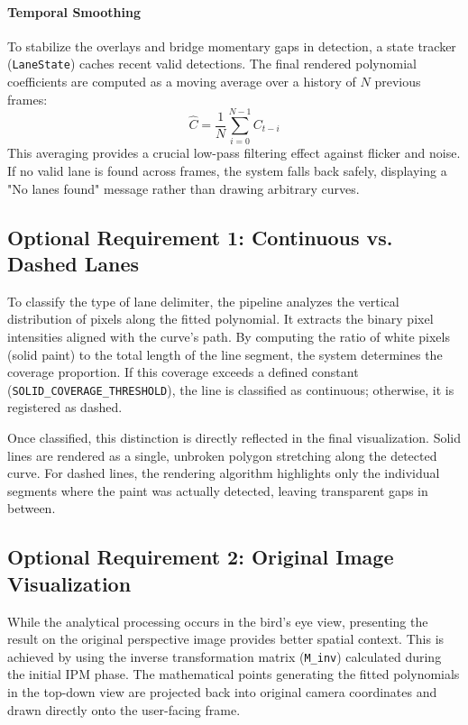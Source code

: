 \documentclass[12pt,a4paper]{article}
\begin{document}
\paragraph{Temporal Smoothing}
To stabilize the overlays and bridge momentary gaps in detection, a state tracker (\texttt{LaneState}) caches recent valid detections. The final rendered polynomial coefficients are computed as a moving average over a history of $N$ previous frames:
\begin{equation}
    \hat{C} = \frac{1}{N} \sum_{i=0}^{N-1} C_{t-i}
\end{equation}
This averaging provides a crucial low-pass filtering effect against flicker and noise. If no valid lane is found across frames, the system falls back safely, displaying a "No lanes found" message rather than drawing arbitrary curves.

\subsection{Optional Requirement 1: Continuous vs. Dashed Lanes}
To classify the type of lane delimiter, the pipeline analyzes the vertical distribution of pixels along the fitted polynomial. It extracts the binary pixel intensities aligned with the curve's path. By computing the ratio of white pixels (solid paint) to the total length of the line segment, the system determines the coverage proportion. If this coverage exceeds a defined constant (\texttt{SOLID\_COVERAGE\_THRESHOLD}), the line is classified as continuous; otherwise, it is registered as dashed. 

Once classified, this distinction is directly reflected in the final visualization. Solid lines are rendered as a single, unbroken polygon stretching along the detected curve. For dashed lines, the rendering algorithm highlights only the individual segments where the paint was actually detected, leaving transparent gaps in between.

\subsection{Optional Requirement 2: Original Image Visualization}
While the analytical processing occurs in the bird's eye view, presenting the result on the original perspective image provides better spatial context. This is achieved by using the inverse transformation matrix (\texttt{M\_inv}) calculated during the initial IPM phase. The mathematical points generating the fitted polynomials in the top-down view are projected back into original camera coordinates and drawn directly onto the user-facing frame.
\end{document}
